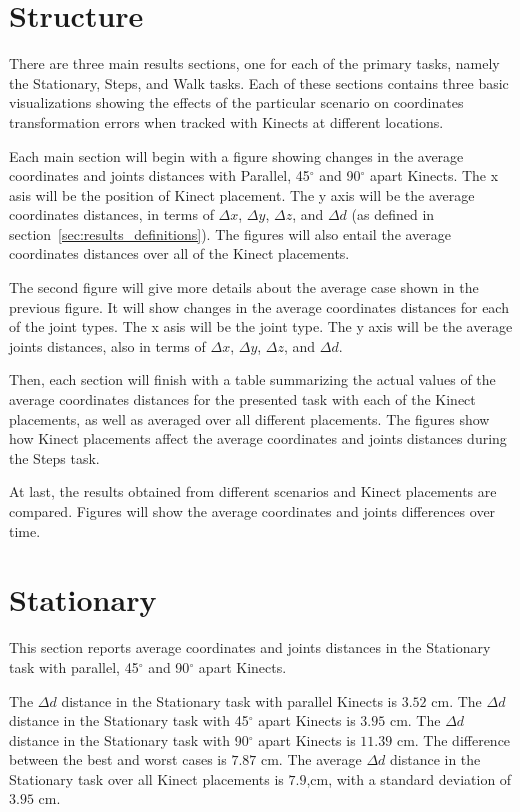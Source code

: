 \section{Structure}
\label{sec:results_structure}

There are three main results sections, one for each of the primary tasks, namely the Stationary, Steps, and Walk tasks. Each of these sections contains three basic visualizations showing the effects of the particular scenario on coordinates transformation errors when tracked with Kinects at different locations.

Each main section will begin with a figure showing changes in the average coordinates and joints distances with Parallel, 45$^{\circ}$ and 90$^{\circ}$ apart Kinects. The x asis will be the position of Kinect placement. The y axis will be the average coordinates distances, in terms of $\Delta x$, $\Delta y$, $\Delta z$, and $\Delta d$ (as defined in section~\ref{sec:results_definitions}). The figures will also entail the average coordinates distances over all of the Kinect placements.

The second figure will give more details about the average case shown in the previous figure. It will show changes in the average coordinates distances for each of the joint types. The x asis will be the joint type. The y axis will be the average joints distances, also in terms of $\Delta x$, $\Delta y$, $\Delta z$, and $\Delta d$.

Then, each section will finish with a table summarizing the actual values of the average coordinates distances for the presented task with each of the Kinect placements, as well as averaged over all different placements. The figures show how Kinect placements affect the average coordinates and joints distances during the Steps task.

At last, the results obtained from different scenarios and Kinect placements are compared. Figures will show the average coordinates and joints differences over time.

\section{Stationary}
\label{sec:results_stationary}

This section reports average coordinates and joints distances in the Stationary task with parallel, 45$^{\circ}$ and 90$^{\circ}$ apart Kinects.

The $\Delta d$ distance in the Stationary task with parallel Kinects is $3.52$ cm. The $\Delta d$ distance in the Stationary task with 45$^{\circ}$ apart Kinects is $3.95$ cm. The $\Delta d$ distance in the Stationary task with 90$^{\circ}$ apart Kinects is $11.39$ cm. The difference between the best and worst cases is $7.87$ cm. The average $\Delta d$ distance in the Stationary task over all Kinect placements is $7.9$,cm, with a standard deviation of $3.95$ cm.

